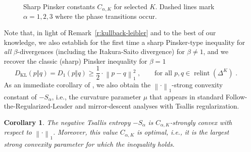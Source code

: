 \documentclass[11pt,oneside,a4paper]{article}
\newcommand{\lrb}[1]{\left(#1\right)}
\newcommand{\lno}[1]{\left\lVert#1\right\rVert}
\theoremstyle{plain}
\newtheorem{corollary}[theorem]{Corollary}
\theoremstyle{definition}
\theoremstyle{remark}
\newcommand{\norm}[1]{\left\lVert #1 \right\rVert}
\newcommand{\simplex}[1]{\Delta^{#1}}
\DeclareMathOperator*{\relint}{relint}
\newcommand{\KL}{D_{\mathrm{KL}}}
\begin{document}
\begin{figure}[t]
\caption{\label{fig:CalphaK-regimes}Sharp Pinsker constants $C_{\alpha,K}$ for selected $K$. Dashed lines mark $\alpha=1,2,3$ where the phase transitions occur.}
\end{figure}
Note that, in light of Remark~\ref{r:kullback-leibler} and to the best of our knowledge, we also establish for the first time a sharp Pinsker-type inequality for \emph{all} $\beta$-divergences (including the Itakura-Saito divergence) for $\beta \neq 1$, and we recover the classic (sharp) Pinsker inequality for $\beta = 1$
\[
    \KL (p\Vert q)
=
    D_1 (p\Vert q)
\ge
    \frac{1}{2} \cdot  \norm{p-q}_1^2\;, \qquad \text{for all $p,q\in\relint\lrb{\simplex{K}}$}\;.
\]
As an immediate corollary of , we also obtain the $\lno{\cdot}_1$-strong convexity constant of $-S_\alpha$, i.e., the curvature parameter $\mu$ that appears in standard Follow-the-Regularized-Leader and mirror-descent analyses with Tsallis regularization.
\begin{corollary}\label{cor:strong-convexity}
The negative Tsallis entropy $-S_\alpha$ is $ C_{\alpha,K}$-strongly convex with respect to $\lno{\cdot}_1$.
Moreover, this value $C_{\alpha,K}$ is optimal, i.e., it is the largest strong convexity parameter for which the inequality holds.
\end{corollary}
\end{document}

